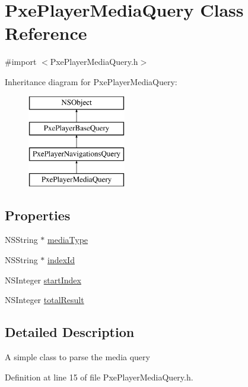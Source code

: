 \hypertarget{interface_pxe_player_media_query}{\section{Pxe\-Player\-Media\-Query Class Reference}
\label{interface_pxe_player_media_query}
}


{\ttfamily \#import $<$Pxe\-Player\-Media\-Query.\-h$>$}

Inheritance diagram for Pxe\-Player\-Media\-Query\-:\begin{figure}[H]
\begin{center}
\leavevmode
\includegraphics[height=4.000000cm]{interface_pxe_player_media_query}
\end{center}
\end{figure}
\subsection*{Properties}
\begin{DoxyCompactItemize}
\item 
N\-S\-String $\ast$ \hyperlink{interface_pxe_player_media_query_a50997f5a1b4f9fef65fcc3afce6abceb}{media\-Type}
\item 
N\-S\-String $\ast$ \hyperlink{interface_pxe_player_media_query_a443b9f77e31e00aae67fc446a14e78f6}{index\-Id}
\item 
N\-S\-Integer \hyperlink{interface_pxe_player_media_query_a0023a0b268c748226777bbc06bbd9206}{start\-Index}
\item 
N\-S\-Integer \hyperlink{interface_pxe_player_media_query_a43c4c967b68b9b3fd6dec716b53fa2bb}{total\-Result}
\end{DoxyCompactItemize}


\subsection{Detailed Description}
A simple class to parse the media query 

Definition at line 15 of file Pxe\-Player\-Media\-Query.\-h.



